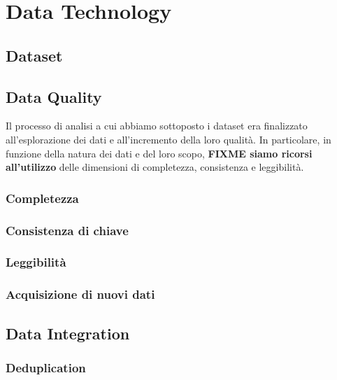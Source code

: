 \setcounter{chapter}{0}

\part{Data Technology}

\chapter{Dataset}

\chapter{Data Quality}
\label{chap:data-quality}
Il processo di analisi a cui abbiamo sottoposto i dataset era finalizzato 
all'esplorazione dei dati e all'incremento della loro qualità. In particolare, 
in funzione della natura dei dati e del loro scopo, \textbf{FIXME siamo ricorsi 
all'utilizzo} delle dimensioni di completezza, consistenza e leggibilità.


\section{Completezza}

\section{Consistenza di chiave}

\section{Leggibilità}

\section{Acquisizione di nuovi dati}

\chapter{Data Integration}
\label{chap:data-integration}

\section{Deduplication}

